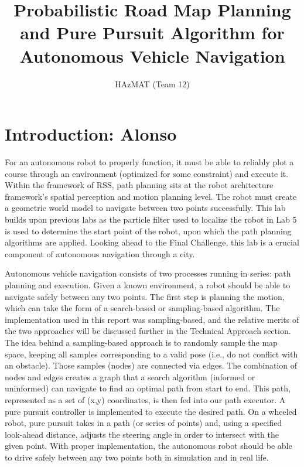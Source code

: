 \documentclass{article}
\title{Probabilistic Road Map Planning and Pure Pursuit Algorithm for Autonomous Vehicle Navigation}
\author{HAzMAT (Team 12)}
\begin{document}
\maketitle



\section{Introduction: Alonso}

For an autonomous robot to properly function, it must be able to reliably plot a course through an environment (optimized for some constraint) and execute it. Within the framework of RSS, path planning sits at the robot architecture framework's spatial perception and motion planning level. The robot must create a geometric world model to navigate between two points successfully. This lab builds upon previous labs as the particle filter used to localize the robot in Lab 5 is used to determine the start point of the robot, upon which the path planning algorithms are applied. Looking ahead to the Final Challenge, this lab is a crucial component of autonomous navigation through a city.

Autonomous vehicle navigation consists of two processes running in series: path planning and execution. Given a known environment, a robot should be able to navigate safely between any two points. The first step is planning the motion, which can take the form of a search-based or sampling-based algorithm. The implementation used in this report was sampling-based, and the relative merits of the two approaches will be discussed further in the Technical Approach section. The idea behind a sampling-based approach is to randomly sample the map space, keeping all samples corresponding to a valid pose (i.e., do not conflict with an obstacle). Those samples (nodes) are connected via edges. The combination of nodes and edges creates a graph that a search algorithm (informed or uninformed) can navigate to find an optimal path from start to end. This path, represented as a set of (x,y) coordinates, is then fed into our path executor. A pure pursuit controller is implemented to execute the desired path. On a wheeled robot, pure pursuit takes in a path (or series of points) and, using a specified look-ahead distance, adjusts the steering angle in order to intersect with the given point. With proper implementation, the autonomous robot should be able to drive safely between any two points both in simulation and in real life.
\end{document}
